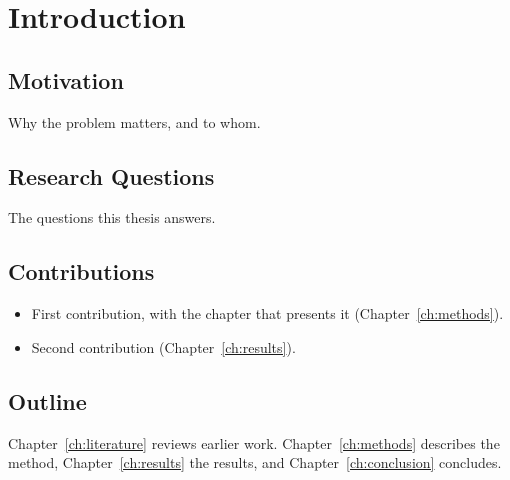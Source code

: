 \chapter{Introduction}
\label{ch:introduction}

\section{Motivation}
Why the problem matters, and to whom.

\section{Research Questions}
The questions this thesis answers.

\section{Contributions}
\begin{itemize}
  \item First contribution, with the chapter that presents it
        (Chapter~\ref{ch:methods}).
  \item Second contribution (Chapter~\ref{ch:results}).
\end{itemize}

\section{Outline}
Chapter~\ref{ch:literature} reviews earlier work. Chapter~\ref{ch:methods}
describes the method, Chapter~\ref{ch:results} the results, and
Chapter~\ref{ch:conclusion} concludes.
